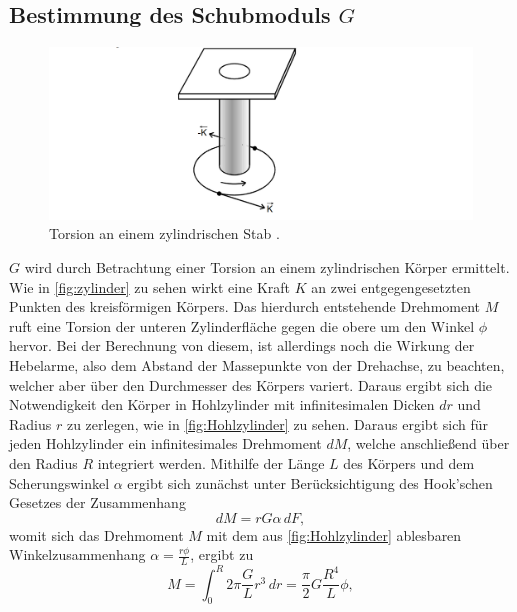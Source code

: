 \subsection{Bestimmung des Schubmoduls $G$}
    \begin{figure}
        \centering
        \includegraphics[width=\textwidth]{content/zylinder.png}
        \caption{Torsion an einem zylindrischen Stab \cite[96]{V102}.}
        \label{fig:zylinder}
    \end{figure}
    $G$ wird durch Betrachtung einer Torsion an einem zylindrischen Körper ermittelt.
    Wie in \autoref{fig:zylinder} zu sehen wirkt eine Kraft $K$ an zwei entgegengesetzten Punkten des kreisförmigen Körpers.  
    Das hierdurch entstehende Drehmoment $M$ ruft eine Torsion der unteren Zylinderfläche gegen die obere um den Winkel $\phi$ hervor.
    Bei der Berechnung von diesem, ist allerdings noch die Wirkung der Hebelarme, also dem Abstand der Massepunkte von der Drehachse,
    zu beachten, welcher aber über den Durchmesser des Körpers variert. Daraus ergibt sich die Notwendigkeit den Körper in Hohlzylinder
    mit infinitesimalen Dicken $dr$ und Radius $r$ zu zerlegen, wie in \autoref{fig:Hohlzylinder} zu sehen. Daraus ergibt sich 
    für jeden Hohlzylinder ein infinitesimales Drehmoment $dM$, welche anschließend über den Radius $R$ integriert werden.
    Mithilfe der Länge $L$ des Körpers und dem Scherungswinkel $\alpha$ ergibt sich zunächst unter Berücksichtigung des Hook'schen Gesetzes
    der Zusammenhang
    \begin{equation}
    \label{eqn:dM}
    dM = r G \alpha \, dF,
    \end{equation}
    womit sich das Drehmoment $M$ mit dem aus \autoref{fig:Hohlzylinder} ablesbaren 
    Winkelzusammenhang $ \alpha = \frac{r \phi}{L}$, ergibt zu 
    \begin{equation}
    \label{eqn:drehmoment}
    M = \int_0^{R} 2 \pi \frac{G}{L} r^3 \, dr = \frac {\pi}{2} G \frac {R^4}{L} \phi,
    \end{equation}
